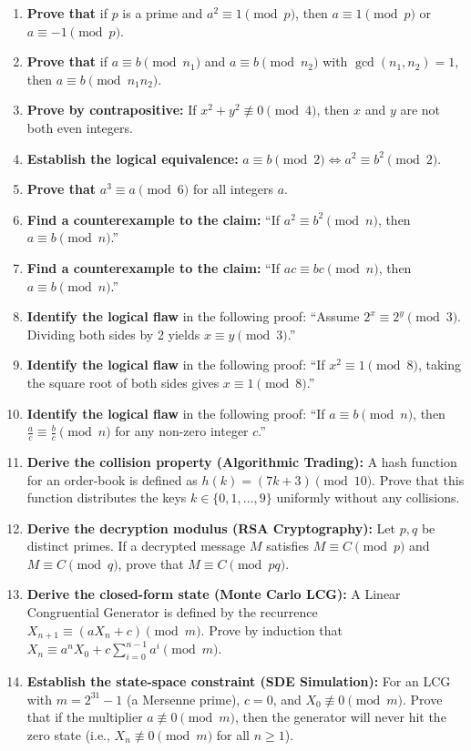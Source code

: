\documentclass{article}
\begin{document}
\begin{enumerate}
    \item \textbf{Prove that} if $p$ is a prime and $a^2 \equiv 1 \pmod p$, then $a \equiv 1 \pmod p$ or $a \equiv -1 \pmod p$.
    \item \textbf{Prove that} if $a \equiv b \pmod{n_1}$ and $a \equiv b \pmod{n_2}$ with $\gcd(n_1, n_2) = 1$, then $a \equiv b \pmod{n_1 n_2}$.
    \item \textbf{Prove by contrapositive:} If $x^2 + y^2 \not\equiv 0 \pmod 4$, then $x$ and $y$ are not both even integers.
    \item \textbf{Establish the logical equivalence:} $a \equiv b \pmod 2 \iff a^2 \equiv b^2 \pmod 2$.
    \item \textbf{Prove that} $a^3 \equiv a \pmod 6$ for all integers $a$.
    \item \textbf{Find a counterexample to the claim:} ``If $a^2 \equiv b^2 \pmod n$, then $a \equiv b \pmod n$.''
    \item \textbf{Find a counterexample to the claim:} ``If $ac \equiv bc \pmod n$, then $a \equiv b \pmod n$.''
    \item \textbf{Identify the logical flaw} in the following proof: ``Assume $2^x \equiv 2^y \pmod 3$. Dividing both sides by 2 yields $x \equiv y \pmod 3$.''
    \item \textbf{Identify the logical flaw} in the following proof: ``If $x^2 \equiv 1 \pmod 8$, taking the square root of both sides gives $x \equiv 1 \pmod 8$.''
    \item \textbf{Identify the logical flaw} in the following proof: ``If $a \equiv b \pmod n$, then $\frac{a}{c} \equiv \frac{b}{c} \pmod n$ for any non-zero integer $c$.''
    \item \textbf{Derive the collision property (Algorithmic Trading):} A hash function for an order-book is defined as $h(k) = (7k + 3) \pmod{10}$. Prove that this function distributes the keys $k \in \{0, 1, \dots, 9\}$ uniformly without any collisions.
    \item \textbf{Derive the decryption modulus (RSA Cryptography):} Let $p, q$ be distinct primes. If a decrypted message $M$ satisfies $M \equiv C \pmod p$ and $M \equiv C \pmod q$, prove that $M \equiv C \pmod{pq}$.
    \item \textbf{Derive the closed-form state (Monte Carlo LCG):} A Linear Congruential Generator is defined by the recurrence $X_{n+1} \equiv (aX_n + c) \pmod m$. Prove by induction that $X_n \equiv a^n X_0 + c \sum_{i=0}^{n-1} a^i \pmod m$.
    \item \textbf{Establish the state-space constraint (SDE Simulation):} For an LCG with $m = 2^{31}-1$ (a Mersenne prime), $c=0$, and $X_0 \not\equiv 0 \pmod m$. Prove that if the multiplier $a \not\equiv 0 \pmod m$, then the generator will never hit the zero state (i.e., $X_n \not\equiv 0 \pmod m$ for all $n \ge 1$).

\end{enumerate}
\end{document}
